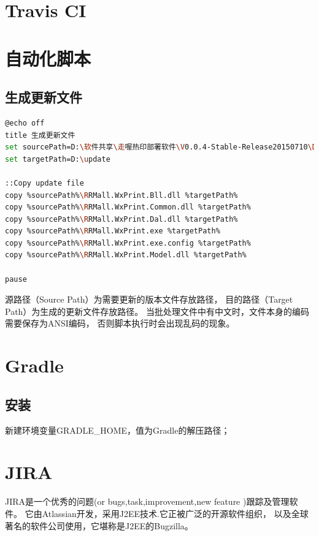 \documentclass{book}
\begin{document}
\section{Travis CI}


\section{自动化脚本}

\subsection{生成更新文件}

\begin{lstlisting}[language=Bash]
@echo off
title 生成更新文件
set sourcePath=D:\软件共享\走喔热印部署软件\V0.0.4-Stable-Release20150710\Debug
set targetPath=D:\update

::Copy update file
copy %sourcePath%\RRMall.WxPrint.Bll.dll %targetPath%
copy %sourcePath%\RRMall.WxPrint.Common.dll %targetPath%
copy %sourcePath%\RRMall.WxPrint.Dal.dll %targetPath%
copy %sourcePath%\RRMall.WxPrint.exe %targetPath%
copy %sourcePath%\RRMall.WxPrint.exe.config %targetPath%
copy %sourcePath%\RRMall.WxPrint.Model.dll %targetPath%

pause
\end{lstlisting}

源路径（Source Path）为需要更新的版本文件存放路径，
目的路径（Target Path）为生成的更新文件存放路径。
当批处理文件中有中文时，文件本身的编码需要保存为ANSI编码，
否则脚本执行时会出现乱码的现象。


\section{Gradle}

\subsection{安装}

新建环境变量GRADLE\_HOME，值为Gradle的解压路径；

\section{JIRA}

JIRA是一个优秀的问题(or bugs,task,improvement,new feature )跟踪及管理软件。
它由Atlassian开发，采用J2EE技术.它正被广泛的开源软件组织，
以及全球著名的软件公司使用，它堪称是J2EE的Bugzilla。
\end{document}
